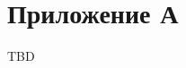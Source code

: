 \chapter*{Приложение А}
\label{appendix:a}

\makeatletter
\let\oldthefigure\thefigure
\renewcommand{\thefigure}{А.\arabic{figure}}
\setcounter{figure}{0}
\makeatother
TBD

\makeatletter
\let\thefigure\oldthefigure
\makeatother

\endinput